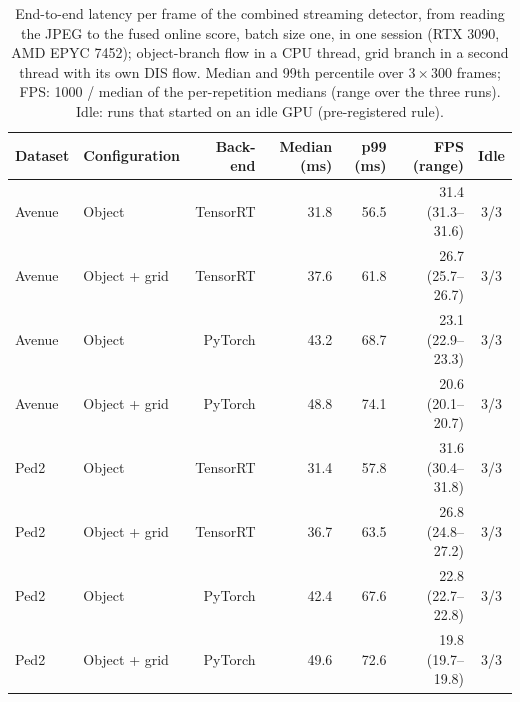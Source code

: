 \begin{table}[t]
\centering
\caption{End-to-end latency per frame of the combined streaming detector, from reading the JPEG to the fused online score, batch size one, in one session (RTX 3090, AMD EPYC 7452); object-branch flow in a CPU thread, grid branch in a second thread with its own DIS flow. Median and 99th percentile over $3\times300$ frames; FPS: 1000 / median of the per-repetition medians (range over the three runs). Idle: runs that started on an idle GPU (pre-registered rule).}
\label{stab:combined}
\small
\begin{tabular}{llrrrrc}
\toprule
Dataset & Configuration & Back-end & Median (ms) & p99 (ms) & FPS (range) & Idle \\
\midrule
Avenue & Object & TensorRT & 31.8 & 56.5 & 31.4 (31.3--31.6) & 3/3 \\
Avenue & Object + grid & TensorRT & 37.6 & 61.8 & 26.7 (25.7--26.7) & 3/3 \\
Avenue & Object & PyTorch & 43.2 & 68.7 & 23.1 (22.9--23.3) & 3/3 \\
Avenue & Object + grid & PyTorch & 48.8 & 74.1 & 20.6 (20.1--20.7) & 3/3 \\
\midrule
Ped2 & Object & TensorRT & 31.4 & 57.8 & 31.6 (30.4--31.8) & 3/3 \\
Ped2 & Object + grid & TensorRT & 36.7 & 63.5 & 26.8 (24.8--27.2) & 3/3 \\
Ped2 & Object & PyTorch & 42.4 & 67.6 & 22.8 (22.7--22.8) & 3/3 \\
Ped2 & Object + grid & PyTorch & 49.6 & 72.6 & 19.8 (19.7--19.8) & 3/3 \\
\bottomrule
\end{tabular}
\end{table}

